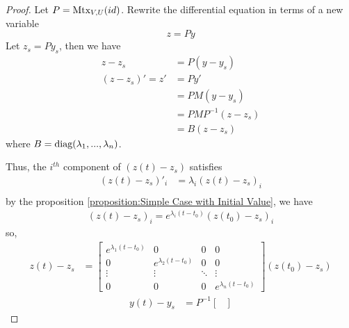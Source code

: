 \documentclass[11pt]{elegantbook}
\begin{document}
\begin{proof}
    Let $P=\textnormal{Mtx}_{V,U}(id)$. Rewrite the differential equation in terms of a new variable $$z=Py$$
    Let $z_s=Py_s$, then we have
    \begin{equation}
        \begin{aligned}
            z-z_s&=P(y-y_s)\\
            (z-z_s)'=z'&=P y'\\
            &=PM(y-y_s)\\
            &=PMP^{-1}(z-z_s)\\
            &=B(z-z_s)
        \end{aligned}
        \nonumber
    \end{equation}
    where $B=\textnormal{diag}(\lambda_1,...,\lambda_n)$.

    Thus, the $i^{th}$ component of $(z(t)-z_s)$ satisfies
    \begin{equation}
        \begin{aligned}
            (z(t)-z_s)'_i&=\lambda_i(z(t)-z_s)_i\\
        \end{aligned}
        \nonumber
    \end{equation}
    by the proposition \ref{proposition:Simple Case with Initial Value}, we have
    \begin{equation}
        \begin{aligned}
            (z(t)-z_s)_i=e^{\lambda_i(t-t_0)}(z(t_0)-z_s)_i
        \end{aligned}
        \nonumber
    \end{equation}
    so,
    \begin{equation}
        \begin{aligned}
            z(t)-z_s&=\begin{bmatrix}
                e^{\lambda_1(t-t_0)}&0&0&0\\
                0&e^{\lambda_2(t-t_0)}&0&0\\
                \vdots&\vdots&\ddots&\vdots\\
                0&0&0&e^{\lambda_n(t-t_0)}
            \end{bmatrix} (z(t_0)-z_s)
        \end{aligned}
        \nonumber
    \end{equation}
    \begin{equation}
        \begin{aligned}
            y(t)-y_s&=P^{-1}\begin{bmatrix}

\end{bmatrix}
\end{aligned}
\end{equation}
\end{proof}
\end{document}
